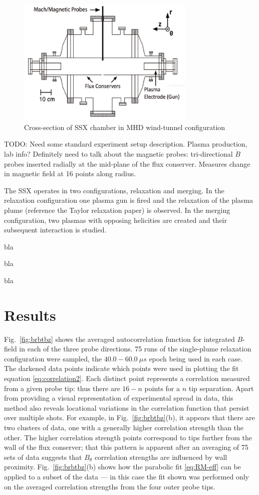 \documentclass[aip,prl,amsmath,amssymb,reprint,superscriptaddress]{revtex4-1} %
\begin{document}
\begin{figure}[!htbp]
\centerline{
\includegraphics[width=8.5cm]{Images/chamberEdit.png}}
\caption{\label{fig:chamber} Cross-section of SSX chamber in MHD wind-tunnel configuration}
\end{figure}

\textsf{TODO: Need some standard experiment setup description. Plasma production, lab info? Definitely need to talk about the magnetic probes: tri-directional $\dot{B}$ probes inserted radially at the mid-plane of the flux conserver. Measures change in magnetic field at 16 points along radius.}

The SSX operates in two configurations, relaxation and merging. In the relaxation configuration one plasma gun is fired and the relaxation of the plasma plume (\textsf{reference the Taylor relaxation paper}) is observed. In the merging configuration, two plasmas with opposing helicities are created and their subsequent interaction is studied.

bla

bla

bla

\section{Results}

Fig.\ \ref{fig:brbtbz} shows the averaged autocorrelation function for integrated $B$-field in each of the three probe directions. 75 runs of the single-plume relaxation configuration were sampled, the $40.0-60.0\ \mu s$ epoch being used in each case. The darkened data points indicate which points were used in plotting the fit equation \eqref{eq:correlation2}. Each distinct point represents a correlation measured from a given probe tip: thus there are $16-n$ points for a $n$ tip separation. Apart from providing a visual representation of experimental spread in data, this method also reveals locational variations in the correlation function that persist over multiple shots. For example, in Fig.\ \ref{fig:brbtbz}(b), it appears that there are two clusters of data, one with a generally higher correlation strength than the other. The higher correlation strength points correspond to tips further from the wall of the flux conserver; that this pattern is apparent after an averaging of 75 sets of data suggests that $B_\theta$ correlation strengths are influenced by wall proximity. Fig.\ \ref{fig:brbtbz}(b) shows how the parabolic fit \eqref{eq:RM-eff} can be applied to a subset of the data --- in this case the fit shown was performed only on the averaged correlation strengths from the four outer probe tips.
\end{document}
